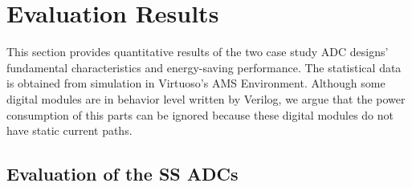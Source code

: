 \documentclass[conference]{IEEEtran}
\begin{document}
\section{Evaluation Results}\label{result}

This section provides quantitative results of the two case study ADC designs’ fundamental characteristics and energy-saving performance. 
The statistical data is obtained from simulation in Virtuoso’s AMS Environment. 
Although some digital modules are in behavior level written by Verilog, we argue that the power consumption of this parts  can be ignored 
because these digital modules do not have static current paths.

\subsection{Evaluation of the SS ADCs}
\end{document}
